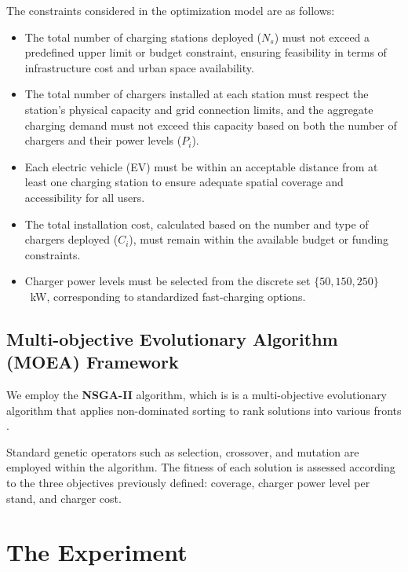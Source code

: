 \documentclass[12pt]{report}
\begin{document}
The constraints considered in the optimization model are as follows:
\begin{itemize}
    \item The total number of charging stations deployed ($N_s$) must not exceed a predefined upper limit or budget constraint, ensuring feasibility in terms of infrastructure cost and urban space availability.

    \item The total number of chargers installed at each station must respect the station's physical capacity and grid connection limits, and the aggregate charging demand must not exceed this capacity based on both the number of chargers and their power levels ($P_i$).

    \item Each electric vehicle (EV) must be within an acceptable distance from at least one charging station to ensure adequate spatial coverage and accessibility for all users.

    \item The total installation cost, calculated based on the number and type of chargers deployed ($C_i$), must remain within the available budget or funding constraints.

    \item Charger power levels must be selected from the discrete set $\{50, 150, 250\}$~kW, corresponding to standardized fast-charging options.
\end{itemize}



\section{Multi-objective Evolutionary Algorithm (MOEA) Framework}
We employ the \textbf{NSGA-II} algorithm, which is  is a multi-objective evolutionary algorithm that applies non-dominated sorting to rank solutions into various fronts \cite{ref8}.

Standard genetic operators such as selection, crossover, and mutation are employed within the algorithm. The fitness of each solution is assessed according to the three objectives previously defined: coverage, charger power level per stand, and charger cost.

\chapter{The Experiment}
\end{document}
